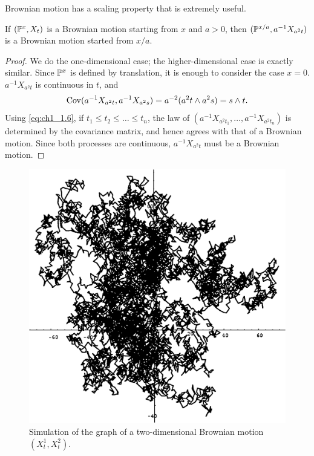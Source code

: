 Brownian motion has a scaling property that is extremely useful.

\mpagebreak

\begin{proposition}\label{prop:ch1_2.2}
If $(\P^x, X_t)$ is a Brownian motion starting from $x$ and $a > 0$, then $(\P^{x/a}, a^{-1}X_{a^2t})$ is a Brownian motion started from $x/a$.
\end{proposition}

\begin{proof}
We do the one-dimensional case; the higher-dimensional case is exactly similar. Since $\P^x$ is defined by translation, it is enough to consider the case $x = 0$. $a^{-1}X_{a^2t}$ is continuous in $t$, and
\[
    \Cov(a^{-1}X_{a^2t}, a^{-1}X_{a^2s}) = a^{-2}(a^2t \wedge a^2s) = s \wedge t.
\]
Using \eqref{eq:ch1_1.6}, if $t_1 \leq t_2 \leq \ldots \leq t_n$, the law of $(a^{-1}X_{a^2t_1},\ldots,a^{-1}X_{a^2t_n})$ is determined by the covariance matrix, and hence agrees with that of a Brownian motion. Since both processes are continuous, $a^{-1}X_{a^2t}$ must be a Brownian motion.
\end{proof}

\bigskip
\begin{figure}[ht]
    \centering\includegraphics{Images/Img2.png}
    \caption{Simulation of the graph of a two-dimensional Brownian motion $(X_t^1, X_t^2)$.}
    \label{fig:ch1_2.2}
\end{figure}

